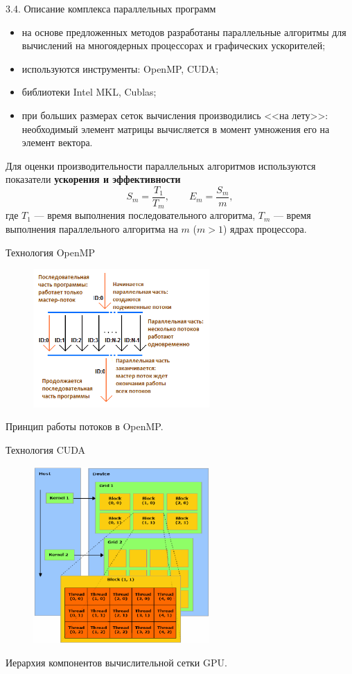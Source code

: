 \documentclass[10pt,pdf, mathserif, hyperref={unicode}]{beamer}
\begin{document}
\begin{frame}{3.4. Описание комплекса параллельных программ}
	\begin{itemize}
		\item на основе предложенных методов разработаны параллельные алгоритмы для вычислений на многоядерных процессорах и графических ускорителей;
		\item используются инструменты: OpenMP, CUDA;
		\item библиотеки Intel MKL, Cublas;
		\item при больших размерах сеток вычисления производились <<на лету>>: необходимый элемент матрицы вычисляется в момент умножения его на элемент вектора.
	\end{itemize}
	
	Для оценки производительности параллельных алгоритмов используются показатели {\textbf{ускорения и эффективности}}
	$$
	S_m=\frac{T_1}{T_m},\quad
	\quad E_m=\frac{S_m}{m}, $$
	где $T_1$ --- время выполнения последовательного алгоритма,
	$T_m$ --- время выполнения параллельного алгоритма на $m$ ($m>1$) ядрах процессора.
\end{frame}
\begin{frame}{Технология OpenMP}
	\begin{figure}[h]
		\centering
		\includegraphics[width=0.6\textwidth]{omp}
	\end{figure}
	\centering
	Принцип работы потоков в OpenMP.
\end{frame}
\begin{frame}{Технология CUDA}
	\begin{figure}[h]
		\centering
		\includegraphics[width=0.6\textwidth]{cuda}
	\end{figure}
	\centering
	Иерархия компонентов вычислительной сетки GPU.
\end{frame}
\end{document}
